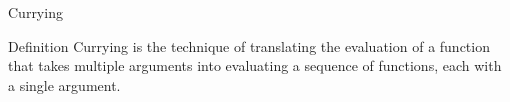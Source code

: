 \begin{frame}{Currying}
    \begin{block}{Definition}
        Currying is the technique of translating the evaluation of a function that takes multiple arguments into evaluating a sequence of functions, each with a single argument.
    \end{block}
\end{frame}
